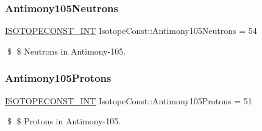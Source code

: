 \subsubsection{\texorpdfstring{Antimony105\+Neutrons}{Antimony105Neutrons}}
{\footnotesize\ttfamily \mbox{\hyperlink{group___isotope_const-_macros_ga5f18360b3e99483a35c32d789e62621c}{I\+S\+O\+T\+O\+P\+E\+C\+O\+N\+S\+T\+\_\+\+I\+NT}} Isotope\+Const\+::\+Antimony105\+Neutrons = 54}

\$ \$ Neutrons in Antimony-\/105. \mbox{\label{group___isotope_const-_antimony-_sb105_ga76339c1fad9ab7cb85bac343df320281}} 
\subsubsection{\texorpdfstring{Antimony105\+Protons}{Antimony105Protons}}
{\footnotesize\ttfamily \mbox{\hyperlink{group___isotope_const-_macros_ga5f18360b3e99483a35c32d789e62621c}{I\+S\+O\+T\+O\+P\+E\+C\+O\+N\+S\+T\+\_\+\+I\+NT}} Isotope\+Const\+::\+Antimony105\+Protons = 51}

\$ \$ Protons in Antimony-\/105. 